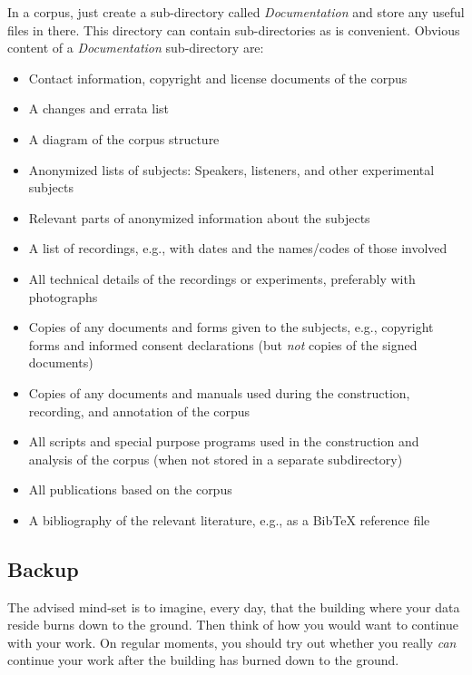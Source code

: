 \documentclass[10pt, a4paper]{article}
\begin{document}
In a corpus, just create a sub-directory called \emph{Documentation} and store any useful files in there. This directory can contain sub-directories as is convenient. Obvious content of a \emph{Documentation} sub-directory are:
\begin{itemize}
\item Contact information, copyright and license documents of the corpus
\item A changes and errata list
\item A diagram of the corpus structure
\item Anonymized lists of subjects: Speakers, listeners, and other experimental subjects
\item Relevant parts of anonymized information about the subjects
\item A list of recordings, e.g., with dates and the names/codes of those involved
\item All technical details of the recordings or experiments, preferably with photographs
\item Copies of any documents and forms given to the subjects, e.g., copyright forms and informed consent declarations (but \emph{not} copies of the signed documents)
\item Copies of any documents and manuals used during the construction, recording, and annotation of the corpus
\item All scripts and special purpose programs used in the construction and analysis of the corpus (when not stored in a separate subdirectory)
\item All publications based on the corpus
\item A bibliography of the relevant literature, e.g., as a BibTeX reference file
\end{itemize}

\subsection{Backup}

The advised mind-set is to imagine, every day, that the building where your data reside burns down to the ground. Then think of how you would want to continue with your work. On regular moments, you should try out whether you really \emph{can} continue your work after the building has burned down to the ground.
\end{document}
